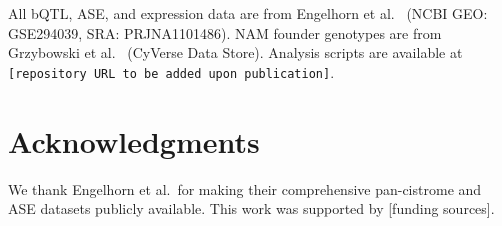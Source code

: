 \documentclass[10pt,letterpaper]{article}
\begin{document}
All bQTL, ASE, and expression data are from Engelhorn et al.\
\cite{engelhorn2025} (NCBI GEO: GSE294039, SRA: PRJNA1101486). NAM founder
genotypes are from Grzybowski et al.\ \cite{grzybowski2023} (CyVerse Data
Store). Analysis scripts are available at
\texttt{[repository URL to be added upon publication]}.


\section*{Acknowledgments}

We thank Engelhorn et al.\ for making their comprehensive pan-cistrome and
ASE datasets publicly available. This work was supported by [funding sources].


\end{document}
